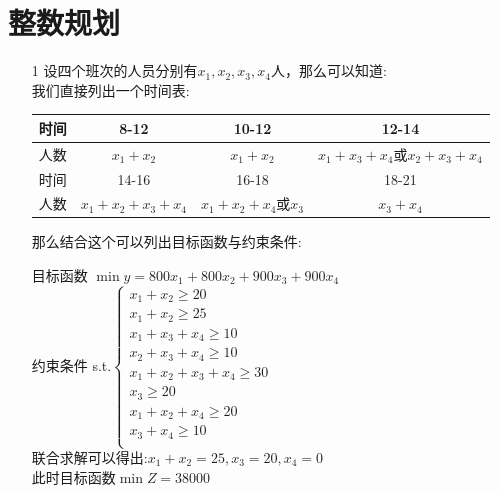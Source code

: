 \documentclass[a4paper,20pt]{article}
\begin{document}
\section{整数规划}
\begin{itemize}
    \item[1] 设四个班次的人员分别有$x_1,x_2,x_3,x_4$人，那么可以知道:
    \\我们直接列出一个时间表:\begin{table}[H]
        \begin{tabular}{|c|c|c|c|}
            \hline
            时间 & 8-12 & 10-12 & 12-14 \\ 
            \hline
            人数 & $x_1+x_2$ & $x_1+x_2$ &$x_1+x_3+x_4\text{或}x_2+x_3+x_4$ \\
            \hline
            时间 & 14-16 &16-18 &18-21\\
            \hline
            人数 &$x_1+x_2+x_3+x_4$  & $x_1+x_2+x_4\text{或}x_3$ & $x_3+x_4$ \\
            \hline
        \end{tabular}
    \end{table}
    那么结合这个可以列出目标函数与约束条件:
    \par \noindent  目标函数 $\min y = 800x_1 + 800x_2+900x_3+900x_4$
    \\约束条件
    s.t.$\left\{\begin{matrix}
        x_1+x_2 \geqslant  20\\
        x_1+x_2 \geqslant  25\\
        x_1+x_3+x_4 \geqslant  10\\
        x_2+x_3+x_4 \geqslant  10\\
        x_1+x_2+x_3+x_4 \geqslant  30\\
        x_3 \geqslant 20\\
        x_1+x_2+x_4 \geqslant  20\\
        x_3+x_4 \geqslant  10\\
    \end{matrix}\right.$
    \\联合求解可以得出:$x_1+x_2=25,x_3=20,x_4=0$
    \\此时目标函数$\min Z=38000$
\end{itemize}
\end{document}
